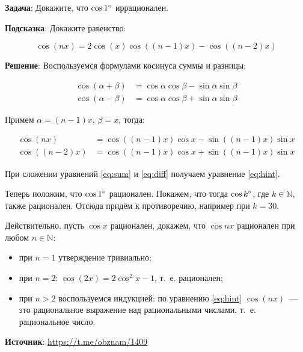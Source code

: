 \documentclass{article} %
\begin{document}
\textbf{Задача}: Докажите, что $\cos 1\degree$ иррационален.

\clearpage

\textbf{Подсказка}: Докажите равенство:

\begin{equation}
\cos(nx) = 2\cos(x) \cos\left( (n-1) x \right) - \cos\left( (n-2) x \right) \label{eq:hint}
\end{equation}

\clearpage

\textbf{Решение}: Воспользуемся формулами косинуса суммы и разницы:

\begin{align*}
  \cos(\alpha + \beta) &= \cos\alpha \cos\beta - \sin\alpha \sin\beta \\
  \cos(\alpha - \beta) &= \cos\alpha \cos\beta + \sin\alpha \sin\beta
\end{align*}

Примем $\alpha = (n-1)x$, $\beta=x$, тогда:

\begin{align}
  \cos(nx) &= \cos((n-1)x) \cos x - \sin((n-1)x) \sin x \label{eq:sum} \\
  \cos((n-2)x) &= \cos((n-1)x) \cos x + \sin((n-1)x) \sin x \label{eq:diff}
\end{align}

При сложении уравнений \ref{eq:sum} и \ref{eq:diff} получаем уравнение \ref{eq:hint}.

Теперь положим, что $\cos 1\degree$ рационален. Покажем, что тогда $\cos k\degree$, где $k \in \mathbb{N}$, также рационален. Отсюда придём к противоречию, например при $k=30$.

Действительно, пусть $\cos x$ рационален, докажем, что $\cos nx$ рационален при любом $n \in \mathbb{N}$:

\begin{itemize}
\item при $n=1$ утверждение тривиально;
\item при $n=2$: $\cos(2x) = 2\cos^2x - 1$, т.~е. рационален;
\item при $n>2$ воспользуемся индукцией: по уравнению \ref{eq:hint} $\cos(nx)$~--- это рациональное выражение над рациональными числами, т.~е. рациональное число.
\end{itemize}

\textbf{Источник}: \url{https://t.me/obznam/1409}
\end{document}
